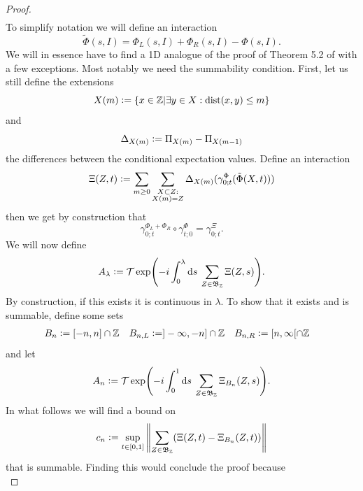 \documentclass[11pt,a4paper,twoside]{article}
\numberwithin{equation}{section}
\begin{document}
{\begin{proof}
\begin{align}
		\end{align}
		To simplify notation we will define an interaction
		\begin{equation}
			\tilde\Phi(s,I)=\Phi_L(s,I)+\Phi_R(s,I)-\Phi(s,I).
		\end{equation}
		We will in essence have to find a 1D analogue of the proof of Theorem 5.2 of \cite{ogata2021h3gmathbb} with a few exceptions. Most notably we need the summability condition. First, let us still define the extensions
		\begin{equation}
			X(m)\vcentcolon= \{x\in\mathbb Z|\exists y\in X:\textrm{dist}(x,y)\leq m\}
		\end{equation}
		and
		\begin{equation}
			\Delta_{X(m)}\vcentcolon= \Pi_{X(m)}-\Pi_{X(m-1)}
		\end{equation}
		the differences between the conditional expectation values. Define an interaction
		\begin{equation}\label{eq:RecastingTheInteraction}
			\Xi(Z,t)\vcentcolon=\sum_{m\geq 0}\sum_{\substack{X\subset Z:\\X(m)=Z}}\Delta_{X(m)}(\gamma^{\Phi}_{0;t}(\tilde{\Phi}(X,t)))
		\end{equation}
		then we get by construction that
		\begin{equation}
			\gamma^{\Phi_L+\Phi_R}_{0;t}\circ\gamma^{\Phi}_{t;0}=\gamma^{\Xi}_{0;t}.
		\end{equation}
		We will now define
		\begin{equation}
			A_\lambda\vcentcolon= \mathcal{T}\exp(-i\int_0^\lambda \text{d} s\: \sum_{Z\in\mathfrak{B}_{\mathbb Z}}\Xi(Z,s)).
		\end{equation}
		By construction, if this exists it is continuous in $\lambda$. To show that it exists and is summable, define some sets
		\begin{align}
			B_n&\vcentcolon= [-n,n]\cap\mathbb Z&B_{n,L}&\vcentcolon= ]-\infty,-n]\cap\mathbb Z&B_{n,R}&\vcentcolon=[n,\infty[\cap\mathbb Z
		\end{align}
		and let
		\begin{equation}
			A_n\vcentcolon= \mathcal{T}\exp(-i\int_0^1 \text{d} s\: \sum_{Z\in\mathfrak{B}_{\mathbb Z}}\Xi_{B_n}(Z,s)).
		\end{equation}
		In what follows we will find a bound on
		\begin{equation}
			c_n\vcentcolon= \sup_{t\in[0,1]}\norm{\sum_{Z\in\mathfrak{B}_\mathbb Z}(\Xi(Z,t)-\Xi_{B_n}(Z,t))}
		\end{equation}
		that is summable. Finding this would conclude the proof because
		\begin{equation}

\end{equation}
\end{proof}}
\end{document}
